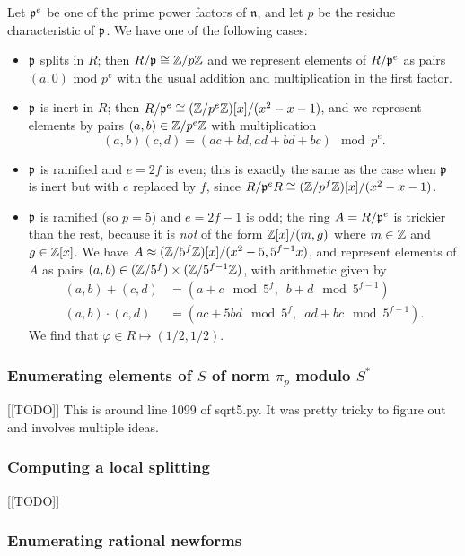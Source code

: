 \documentclass{amsart}
\newcommand{\n}{\mathfrak{n}}
\begin{document}
Let $\mathfrak{p}^e$ be one of the prime power factors of $\n$, and let $p$ be the residue
characteristic of $\mathfrak{p}$. We have one of the following cases:
\begin{itemize}
\item $\mathfrak{p}$ splits in $R$; then $R/\mathfrak{p}\cong \mathbb{Z}/p\mathbb{Z}$ and we represent elements
of $R/\mathfrak{p}^e$ as pairs $(a,0)$ mod $p^e$ with the usual addition and multiplication
in the first factor.
\item $\mathfrak{p}$ is inert in $R$; then $R/\mathfrak{p}^e\cong (\mathbb{Z}/p^e\mathbb{Z})[x]/(x^2-x-1)$,
and we represent elements by pairs $(a,b) \in \mathbb{Z}/p^e\mathbb{Z}$ with multiplication
$$(a,b)(c,d) = (ac+bd,ad+bd+bc) \mod p^e.$$
\item $\mathfrak{p}$ is ramified and $e=2f$ is even; this is exactly the
same as the case when $\mathfrak{p}$ is inert but with $e$ replaced by $f$,
since $R/\mathfrak{p}^eR \cong (\mathbb{Z}/p^{f}\mathbb{Z})[x]/(x^2-x-1)$.
\item $\mathfrak{p}$ is ramified (so $p=5$) and $e=2f-1$ is odd; the ring $A=R/\mathfrak{p}^e$
  is trickier than the rest, because it is {\em not} of the form
  $\mathbb{Z}[x]/(m,g)$ where $m\in\mathbb{Z}$ and $g \in\mathbb{Z}[x]$.  We have $A \approx
  (\mathbb{Z}/5^f\mathbb{Z})[x]/(x^2-5, 5^{f-1}x)$, and represent elements of $A$ as
  pairs $(a,b) \in (\mathbb{Z}/5^f)\times (\mathbb{Z}/5^{f-1}\mathbb{Z})$, with arithmetic
  given by
\begin{align*}
(a,b) + (c,d) &= (a+c \mod 5^f,\,\,\, b+d \mod 5^{f-1})\\
(a,b)\cdot (c,d) &= (ac+5bd \mod 5^f,\,\,\, ad+bc \mod 5^{f-1}).
\end{align*}
 We find that $ \varphi \in R \mapsto (1/2,1/2)$.
\end{itemize}



\subsubsection{Enumerating elements of $S$ of norm $\pi_p$ modulo $S^*$}
[[TODO]]
This is around line 1099 of sqrt5.py.  It was pretty tricky to figure out
and involves multiple ideas.

\subsubsection{Computing a local splitting}
[[TODO]]

\subsubsection{Enumerating rational newforms}
\end{document}
